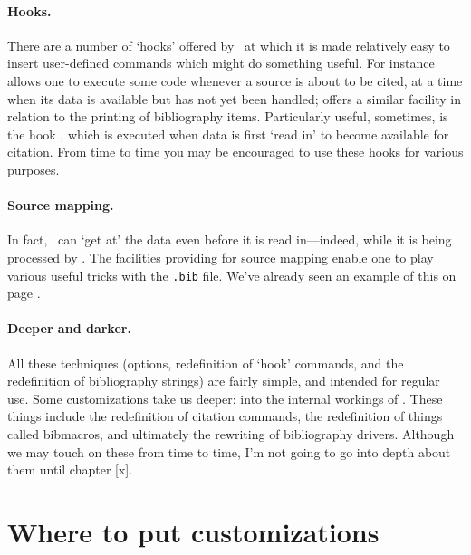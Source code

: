 \paragraph{Hooks.} There are a number
of `hooks' offered by \biblatex\ at which it is made relatively easy
to insert user-defined commands which might do something useful. For
instance  allows one to execute some code whenever
a source is about to be cited, at a time when its data is available
but has not yet been handled;  offers a similar
facility in relation to the printing of bibliography
items. Particularly useful, sometimes, is the hook ,
which is executed when data is first `read in' to become available for
citation. From time to time you may be encouraged to use these hooks
for various purposes.

\paragraph{Source mapping.} In fact,
\biblatex\ can `get at' the data even before it is read in---indeed,
while it is being processed by . The facilities
providing for source mapping enable one to play various useful tricks
with the \verb|.bib| file. We've already seen an example of this on
page \pageref{datamap}.

\paragraph{Deeper and darker.}
All these techniques (options, redefinition of `hook' commands, and
the redefinition of bibliography strings) are fairly simple, and
intended for regular use. Some customizations take us deeper: into the
internal workings of \biblatex. These things include the redefinition
of citation commands, the redefinition of things called bibmacros, and
ultimately the rewriting of bibliography drivers. Although we may
touch on these from time to time, I'm not going to go into depth about
them until chapter [x].

\section{Where to put customizations}

